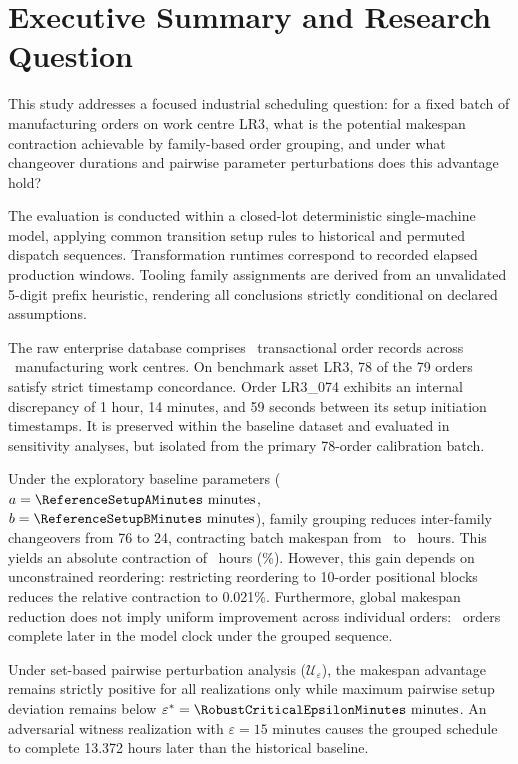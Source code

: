 
\section{Executive Summary and Research Question}
\label{sec:executive_summary}

This study addresses a focused industrial scheduling question: for a fixed batch of manufacturing orders on work centre LR3, what is the potential makespan contraction achievable by family-based order grouping, and under what changeover durations and pairwise parameter perturbations does this advantage hold?

The evaluation is conducted within a closed-lot deterministic single-machine model, applying common transition setup rules to historical and permuted dispatch sequences. Transformation runtimes correspond to recorded elapsed production windows. Tooling family assignments are derived from an unvalidated 5-digit prefix heuristic, rendering all conclusions strictly conditional on declared assumptions.

The raw enterprise database comprises \TotalRawOrders\ transactional order records across \MonitoredWorkCentres\ manufacturing work centres. On benchmark asset LR3, 78 of the 79 orders satisfy strict timestamp concordance. Order LR3\_074 exhibits an internal discrepancy of 1 hour, 14 minutes, and 59 seconds between its setup initiation timestamps. It is preserved within the baseline dataset and evaluated in sensitivity analyses, but isolated from the primary 78-order calibration batch.

Under the exploratory baseline parameters ($a = \ReferenceSetupAMinutes\text{ minutes}$, $b = \ReferenceSetupBMinutes\text{ minutes}$), family grouping reduces inter-family changeovers from 76 to 24, contracting batch makespan from \HistoricalMakespanHours\ to \GroupedMakespanHours\ hours. This yields an absolute contraction of \ReferenceSavingHours\ hours (\ReferenceSavingPercent\%). However, this gain depends on unconstrained reordering: restricting reordering to 10-order positional blocks reduces the relative contraction to 0.021\%. Furthermore, global makespan reduction does not imply uniform improvement across individual orders: \CompletionLaterOrders\ orders complete later in the model clock under the grouped sequence.

Under set-based pairwise perturbation analysis ($\mathcal{U}_\varepsilon$), the makespan advantage remains strictly positive for all realizations only while maximum pairwise setup deviation remains below $\varepsilon^* = \RobustCriticalEpsilonMinutes\text{ minutes}$. An adversarial witness realization with $\varepsilon = 15\text{ minutes}$ causes the grouped schedule to complete 13.372 hours later than the historical baseline.

